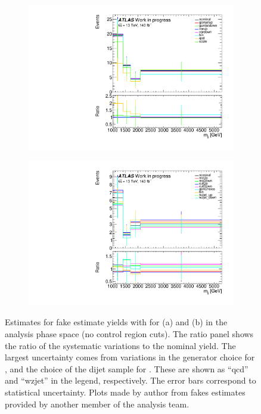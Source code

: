 \begin{figure}[t]
\centering
\begin{subfigure}[b]{0.48\textwidth}
    \centering
    \includegraphics[width=\textwidth]{plots/diffx/ratio_mjj_jfakee.pdf}
    \caption{}
\end{subfigure}
\hfill
\begin{subfigure}[b]{0.48\textwidth}
    \centering
    \includegraphics[width=\textwidth]{plots/diffx/ratio_mjj_jfakemu.pdf}
    \caption{}
\end{subfigure}
\caption{Estimates for fake estimate yields with \mjj for \jfakee (a) and \jfakemu (b) in the analysis phase space (no control region cuts). The ratio panel shows the ratio of the systematic variations to the nominal yield. The largest uncertainty comes from variations in the \qcdwy generator choice for \jfakee, and the choice of the dijet sample for \jfakemu. These are shown as ``qcd'' and ``wzjet'' in the legend, respectively. The error bars correspond to statistical uncertainty. Plots made by author from fakes estimates provided by another member of the analysis team.\label{fig:vbswy:jfakel}}
\end{figure}

